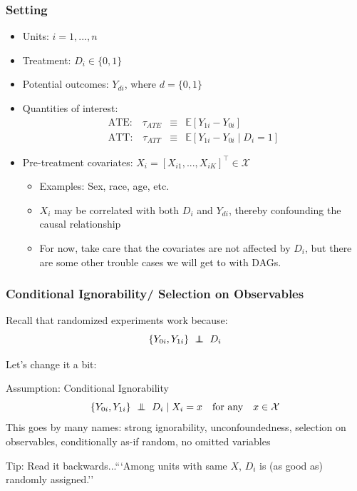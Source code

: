 \documentclass[xcolor=dvipsnames]{beamer}
\newcommand\E{\mathbb{E}}
\newcommand\indep{\protect\mathpalette{\protect\independenT}{\perp}}
\def\independenT#1#2{\mathrel{\rlap{$#1#2$}\mkern2mu{#1#2}}}
\begin{document}
\begin{frame}
\frametitle{Setting}
\small
\vspace{-.25\baselineskip}
\begin{itemize}
\item<1-> Units: $i = 1, ..., n$
\item<1-> Treatment: $D_i \in \{0,1\}$
\item<1-> Potential outcomes: $Y_{di}$, where $d = \{0,1\}$
\smallskip
\item<2-> Quantities of interest:
\begin{eqnarray*}
\text{ATE:} \quad \tau_{ATE} & \equiv & \E[Y_{1i} - Y_{0i}] \\
\text{ATT:} \quad \tau_{ATT} & \equiv & \E[Y_{1i} - Y_{0i} \mid D_i=1] 
\end{eqnarray*}
\smallskip
\item<3-> \alert{Pre-treatment covariates}: $X_i = [X_{i1}, ..., X_{iK}]^\top \in \mathcal{X}$
	\begin{itemize}
	\footnotesize
	\addtolength{\itemsep}{.25\baselineskip}
	\item Examples: Sex, race, age, etc.
	\item $X_i$ may be correlated with both $D_i$ and $Y_{di}$, thereby \alert{confounding} the causal relationship \pause
	\item For now, take care that the covariates are not affected by $D_i$, but there are some other trouble cases we will get to with DAGs.
	\end{itemize}
\end{itemize}

\end{frame}


\begin{frame}
\frametitle{Conditional Ignorability/ Selection on Observables}
\small
{} Recall that randomized experiments work because:\\
$$ \{ Y_{0i}, Y_{1i}\} \ \indep \ D_i $$

 Let's change it a bit:\\
\begin{block}{Assumption: Conditional Ignorability}
$$ \{ Y_{0i}, Y_{1i}\} \ \indep \ D_i \mid X_i = x \quad \text{for any} \quad x \in \mathcal{X} $$
\smallskip
\footnotesize
This goes by many names: strong ignorability, unconfoundedness, selection on observables, conditionally as-if random, no omitted variables \\
\end{block}
\smallskip
{} Tip: Read it backwards...```Among units with same $X$, $D_i$ is (as good as) randomly assigned.''
\end{frame}
\end{document}
